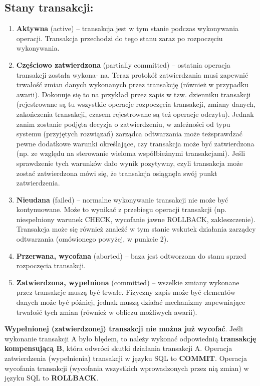 \documentclass[12pt]{article}
\begin{document}
    \subsection{Stany transakcji:}
    \begin{enumerate}
        \item \textbf{Aktywna} (active) – transakcja jest w tym stanie podczas wykonywania operacji. Transakcja
        przechodzi do tego stanu zaraz po rozpoczęciu wykonywania.
        
        \item \textbf{Częściowo zatwierdzona} (partially committed) – ostatnia operacja transakcji została wykona-
        na. Teraz protokół zatwierdzania musi zapewnić trwałość zmian danych wykonanych przez
        transakcję (również w przypadku awarii). Dokonuje się to na przykład przez zapis w tzw. dzienniku
        transakcji (rejestrowane są tu wszystkie operacje rozpoczęcia transakcji, zmiany danych,
        zakończenia transakcji, czasem rejestrowane są też operacje odczytu). Jednak zanim zostanie
        podjęta decyzja o zatwierdzeniu, w zależności od typu systemu (przyjętych rozwiązań) zarządca
        odtwarzania może teżsprawdzać pewne dodatkowe warunki określające, czy transakcja może być
        zatwierdzona (np. ze względu na sterowanie wieloma współbieżnymi transakcjami). Jeśli
        sprawdzenie tych warunków dało wynik pozytywny, czyli transakcja może zostać zatwierdzona
        mówi się, że transakcja osiągnęła swój punkt zatwierdzenia.
        \item \textbf{Nieudana} (failed) – normalne wykonywanie transakcji nie może być kontynuowane. Może to wynikać z przebiegu operacji transakcji (np. niespełniony warunek CHECK, wycofanie jawne
        ROLLBACK, zakleszczenie). Transakcja może się również znaleźć w tym stanie wskutek działania
        zarządcy odtwarzania (omówionego powyżej, w punkcie 2).
        \item \textbf{Przerwana, wycofana} (aborted) – baza jest odtworzona do stanu sprzed rozpoczęcia
        transakcji.
        \item \textbf{Zatwierdzona, wypełniona} (committed) – wszelkie zmiany wykonane przez transakcje muszą
        być trwałe. Fizyczny zapis może być elementów danych może być później, jednak muszą działać
        mechanizmy zapewniające trwałość tych zmian (również w obliczu możliwych awarii).
    \end{enumerate}
    
    \textbf{Wypełnionej (zatwierdzonej) transakcji nie można już wycofać}. Jeśli wykonanie transakcji A
    było błędem, to należy wykonać odpowiednią \textbf{transakcję kompensującą B}, która odwróci skutki
    działania transakcji A.
    Operacja zatwierdzenia (wypełnienia) transakcji w języku SQL to \textbf{COMMIT}.
    Operacja wycofania transakcji (wycofania wszystkich wprowadzonych przez nią zmian) w języku
    SQL to \textbf{ROLLBACK}.
    
\end{document}
